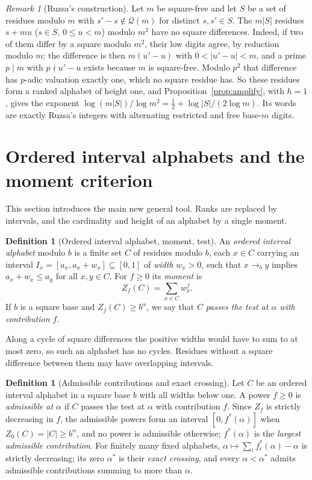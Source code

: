 \documentclass[11pt]{article}
\theoremstyle{definition}
\newtheorem{definition}[theorem]{Definition}
\theoremstyle{remark}
\newtheorem{remark}[theorem]{Remark}
\newcommand{\QR}{\mathcal Q}
\newcommand{\card}[1]{\lvert #1\rvert}
\begin{document}
\begin{remark}[Ruzsa's construction]\label{rem:ruzsa}
Let $m$ be square-free and let $S$ be a set of residues modulo $m$ with
$s'-s\notin\QR(m)$ for distinct $s,s'\in S$. The $m\card S$ residues $s+mu$
($s\in S$, $0\le u<m$) modulo $m^2$ have no square differences. Indeed, if two
of them differ by a square modulo $m^2$, their low digits agree, by reduction
modulo $m$; the difference is then $m(u'-u)$ with $0<\card{u'-u}<m$, and a
prime $p\mid m$ with $p\nmid u'-u$ exists because $m$ is square-free. Modulo
$p^2$ that difference has $p$-adic valuation exactly one, which no square
residue has. So these residues form a ranked alphabet of height one, and
Proposition~\ref{prop:amplify}, with $h=1$, gives the exponent
$\log(m\card S)/\log m^2=\frac12+\log\card S/(2\log m)$. Its words are exactly
Ruzsa's integers with alternating restricted and free base-$m$ digits.
\end{remark}

\section{Ordered interval alphabets and the moment criterion}\label{sec:criterion}
This section introduces the main new general tool. Ranks are replaced by
intervals, and the cardinality and height of an alphabet by a single moment.

\begin{definition}[Ordered interval alphabet, moment, test]\label{def:interval}
An \emph{ordered interval alphabet} modulo $b$ is a finite set $C$ of residues
modulo $b$, each $x\in C$ carrying an interval $I_x=[a_x,a_x+w_x]\subseteq[0,1]$
of \emph{width} $w_x>0$, such that $x\to_b y$ implies $a_x+w_x\le a_y$ for all
$x,y\in C$. For $f\ge0$ its \emph{moment} is
\[
 Z_f(C)=\sum_{x\in C}w_x^f .
\]
If $b$ is a square base and $Z_f(C)\ge b^\alpha$, we say that $C$
\emph{passes the test at $\alpha$ with contribution $f$}.
\end{definition}
Along a cycle of square differences the positive widths would have to sum to
at most zero, so such an alphabet has no cycles. Residues without a square
difference between them may have overlapping intervals.

\begin{definition}[Admissible contributions and exact crossing]\label{def:admissible}
Let $C$ be an ordered interval alphabet in a square base $b$ with all widths
below one. A power $f\ge0$ is \emph{admissible at $\alpha$} if $C$ passes the
test at $\alpha$ with contribution $f$. Since $Z_f$ is strictly decreasing in
$f$, the admissible powers form an interval $[0,f^*(\alpha)]$ when
$Z_0(C)=\card C\ge b^\alpha$, and no power is admissible otherwise;
$f^*(\alpha)$ is the \emph{largest admissible contribution}. For finitely many
fixed alphabets, $\alpha\mapsto\sum_if_i^*(\alpha)-\alpha$ is strictly
decreasing; its zero $\alpha^*$ is their \emph{exact crossing}, and every
$\alpha<\alpha^*$ admits admissible contributions summing to more than $\alpha$.
\end{definition}
\end{document}
